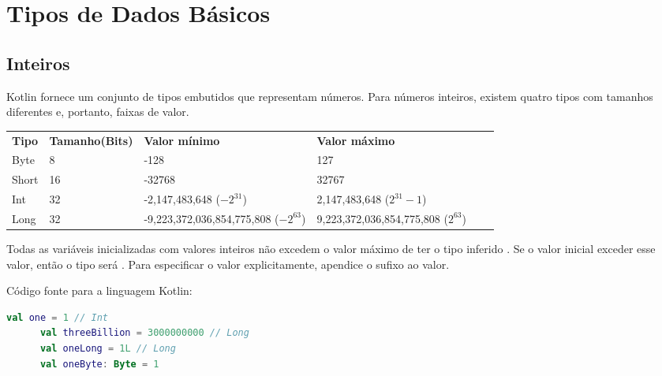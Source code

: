 \section{Tipos de Dados B\'{a}sicos}
    

    
         
 \lipsum[2]
  \subsection{Inteiros}
  Kotlin fornece um conjunto de tipos embutidos que representam números.
  Para números inteiros, existem quatro tipos com tamanhos diferentes e, portanto, faixas de valor.
    \begin{table}[ht]
      \centering
      
      \begin{tabular}{p{2cm} p{2.5cm} p{6.0cm} p{6.0cm}|cp{1cm}}
      \textbf{Tipo} \centering & \textbf{Tamanho(Bits)} & \textbf{Valor mínimo} & \textbf{Valor máximo} \\ 
          Byte \centering    & 8  \centering  & -128   & 127                 \\ 
          Short \centering  & 16  \centering & -32768   & 32767             \\ 
          Int \centering    & 32  \centering &  -2,147,483,648 ($-2 ^{31}$)      &2,147,483,648 ($2^{31}-1$)            \\ 
          Long \centering    & 32  \centering &  -9,223,372,036,854,775,808 ($-2 ^{63}$)      &9,223,372,036,854,775,808 ($2^{63}$)\\ 
      
      \end{tabular}
      \label{Tabela1}
      \end{table}
      Todas as variáveis inicializadas com valores inteiros não excedem o valor 
      máximo de ter o tipo inferido . Se o valor inicial exceder esse valor, 
      então o tipo será . Para especificar o valor explicitamente, apendice o sufixo ao valor.
     

    C\'{o}digo fonte para a linguagem Kotlin:
    \begin{lstlisting}[label={lst:example1}, language=Kotlin]
      val one = 1 // Int
      val threeBillion = 3000000000 // Long
      val oneLong = 1L // Long
      val oneByte: Byte = 1
    \end{lstlisting}

    

